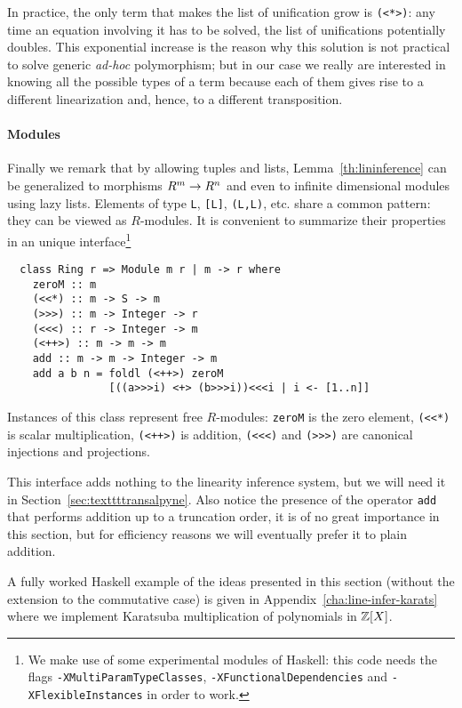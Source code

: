 In practice, the only term that makes the list of unification grow is
\lstinline{(<*>)}: any time an equation involving it has to be solved,
the list of unifications potentially doubles. This exponential
increase is the reason why this solution is not practical to solve
generic \emph{ad-hoc} polymorphism; but in our case we really are
interested in knowing all the possible types of a term because each of
them gives rise to a different linearization and, hence, to a
different transposition.

\paragraph{Modules}
\label{sec:modules}
Finally we remark that by allowing tuples and lists,
Lemma~\ref{th:lininference} can be generalized to morphisms $R^m\rightarrow
R^n$ and even to infinite dimensional modules using lazy
lists. Elements of type \lstinline{L}, \lstinline{[L]},
\lstinline{(L,L)}, etc. share a common pattern: they can be viewed as
$R$-modules. It is convenient to summarize their properties in an
unique interface\footnote{We make use of some experimental modules of
  Haskell: this code needs the flags
  \lstinline{-XMultiParamTypeClasses},
  \lstinline{-XFunctionalDependencies} and
  \lstinline{-XFlexibleInstances} in order to work.}
\begin{lstlisting}
  class Ring r => Module m r | m -> r where
    zeroM :: m
    (<<*) :: m -> S -> m
    (>>>) :: m -> Integer -> r
    (<<<) :: r -> Integer -> m
    (<++>) :: m -> m -> m
    add :: m -> m -> Integer -> m
    add a b n = foldl (<++>) zeroM
                [((a>>>i) <+> (b>>>i))<<<i | i <- [1..n]]
\end{lstlisting}

Instances of this class represent free $R$-modules: \lstinline{zeroM}
is the zero element, \lstinline{(<<*)} is scalar multiplication,
\lstinline{(<++>)} is addition, \lstinline{(<<<)} and
\lstinline{(>>>)} are canonical injections and projections.

This interface adds nothing to the linearity inference system, but we
will need it in Section~\ref{sec:texttttransalpyne}.  Also notice the
presence of the operator \lstinline{add} that performs addition up to
a truncation order, it is of no great importance in this section, but
for efficiency reasons we will eventually prefer it to plain addition.

A fully worked Haskell example of the ideas presented in this section
(without the extension to the commutative case) is given in
Appendix~\ref{cha:line-infer-karats} where we implement Karatsuba
multiplication of polynomials in $\mathbb{Z}[X]$.


%
